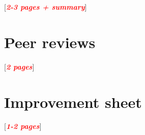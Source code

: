 \documentclass[10pt]{article}
\newcommand{\todo}[1]{
  \begin{center}
    [\textcolor{red}{\textbf{\textit{#1}}}]
  \end{center}
}
\begin{document}
    \todo{2-3 pages + summary}

    

  \section{Peer reviews}
    \todo{2 pages}

  \section{Improvement sheet}
    \todo{1-2 pages}

%
%
%
%
%
\end{document}
